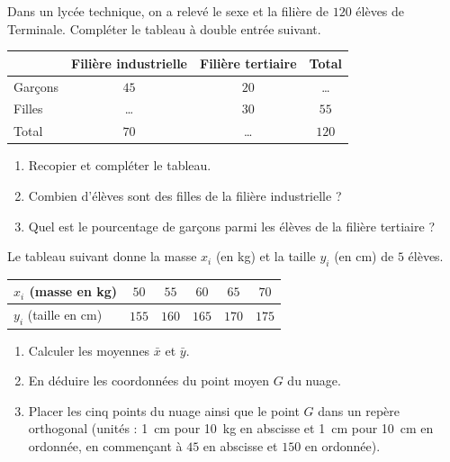 \documentclass[11pt]{article}
\begin{document}
\begin{exercice}
Dans un lycée technique, on a relevé le sexe et la filière de $120$ élèves de Terminale. Compléter le tableau à double entrée suivant.

\begin{center}
\begin{tabular}{|l|c|c|c|}
\hline
 & Filière industrielle & Filière tertiaire & Total \\
\hline
Garçons & $45$ & $20$ & \ldots \\
\hline
Filles & \ldots & $30$ & $55$ \\
\hline
Total & $70$ & \ldots & $120$ \\
\hline
\end{tabular}
\end{center}

\begin{enumerate}
\item Recopier et compléter le tableau.
\item Combien d'élèves sont des filles de la filière industrielle ?
\item Quel est le pourcentage de garçons parmi les élèves de la filière tertiaire ?
\end{enumerate}
\end{exercice}

\begin{exercice}
Le tableau suivant donne la masse $x_i$ (en \si{\kg}) et la taille $y_i$ (en \si{\cm}) de $5$ élèves.

\begin{center}
\begin{tabular}{|l|c|c|c|c|c|}
\hline
$x_i$ (masse en \si{\kg}) & $50$ & $55$ & $60$ & $65$ & $70$ \\
\hline
$y_i$ (taille en \si{\cm}) & $155$ & $160$ & $165$ & $170$ & $175$ \\
\hline
\end{tabular}
\end{center}

\begin{enumerate}
\item Calculer les moyennes $\bar{x}$ et $\bar{y}$.
\item En déduire les coordonnées du point moyen $G$ du nuage.
\item Placer les cinq points du nuage ainsi que le point $G$ dans un repère orthogonal (unités : \SI{1}{\cm} pour \SI{10}{\kg} en abscisse et \SI{1}{\cm} pour \SI{10}{\cm} en ordonnée, en commençant à $45$ en abscisse et $150$ en ordonnée).
\end{enumerate}
\end{exercice}
\end{document}
